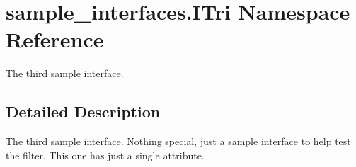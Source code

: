 \hypertarget{namespacesample__interfaces_1_1_i_tri}{\section{sample\-\_\-interfaces.\-I\-Tri Namespace Reference}
\label{namespacesample__interfaces_1_1_i_tri}
}


The third sample interface.  




\subsection{Detailed Description}
The third sample interface. Nothing special, just a sample interface to help test the filter. This one has just a single attribute. 